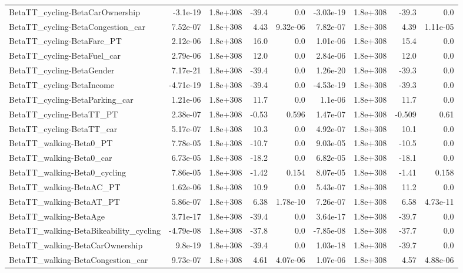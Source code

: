 \begin{tabular}{lrrrrrrrr}
BetaTT_cycling-BetaCarOwnership & -3.1e-19 & 1.8e+308 & -39.4 & 0.0 & -3.03e-19 & 1.8e+308 & -39.3 & 0.0 \\
BetaTT_cycling-BetaCongestion_car & 7.52e-07 & 1.8e+308 & 4.43 & 9.32e-06 & 7.82e-07 & 1.8e+308 & 4.39 & 1.11e-05 \\
BetaTT_cycling-BetaFare_PT & 2.12e-06 & 1.8e+308 & 16.0 & 0.0 & 1.01e-06 & 1.8e+308 & 15.4 & 0.0 \\
BetaTT_cycling-BetaFuel_car & 2.79e-06 & 1.8e+308 & 12.0 & 0.0 & 2.84e-06 & 1.8e+308 & 12.0 & 0.0 \\
BetaTT_cycling-BetaGender & 7.17e-21 & 1.8e+308 & -39.4 & 0.0 & 1.26e-20 & 1.8e+308 & -39.3 & 0.0 \\
BetaTT_cycling-BetaIncome & -4.71e-19 & 1.8e+308 & -39.4 & 0.0 & -4.53e-19 & 1.8e+308 & -39.3 & 0.0 \\
BetaTT_cycling-BetaParking_car & 1.21e-06 & 1.8e+308 & 11.7 & 0.0 & 1.1e-06 & 1.8e+308 & 11.7 & 0.0 \\
BetaTT_cycling-BetaTT_PT & 2.38e-07 & 1.8e+308 & -0.53 & 0.596 & 1.47e-07 & 1.8e+308 & -0.509 & 0.61 \\
BetaTT_cycling-BetaTT_car & 5.17e-07 & 1.8e+308 & 10.3 & 0.0 & 4.92e-07 & 1.8e+308 & 10.1 & 0.0 \\
BetaTT_walking-Beta0_PT & 7.78e-05 & 1.8e+308 & -10.7 & 0.0 & 9.03e-05 & 1.8e+308 & -10.5 & 0.0 \\
BetaTT_walking-Beta0_car & 6.73e-05 & 1.8e+308 & -18.2 & 0.0 & 6.82e-05 & 1.8e+308 & -18.1 & 0.0 \\
BetaTT_walking-Beta0_cycling & 7.86e-05 & 1.8e+308 & -1.42 & 0.154 & 8.07e-05 & 1.8e+308 & -1.41 & 0.158 \\
BetaTT_walking-BetaAC_PT & 1.62e-06 & 1.8e+308 & 10.9 & 0.0 & 5.43e-07 & 1.8e+308 & 11.2 & 0.0 \\
BetaTT_walking-BetaAT_PT & 5.86e-07 & 1.8e+308 & 6.38 & 1.78e-10 & 7.26e-07 & 1.8e+308 & 6.58 & 4.73e-11 \\
BetaTT_walking-BetaAge & 3.71e-17 & 1.8e+308 & -39.4 & 0.0 & 3.64e-17 & 1.8e+308 & -39.7 & 0.0 \\
BetaTT_walking-BetaBikeability_cycling & -4.79e-08 & 1.8e+308 & -37.8 & 0.0 & -7.85e-08 & 1.8e+308 & -37.7 & 0.0 \\
BetaTT_walking-BetaCarOwnership & 9.8e-19 & 1.8e+308 & -39.4 & 0.0 & 1.03e-18 & 1.8e+308 & -39.7 & 0.0 \\
BetaTT_walking-BetaCongestion_car & 9.73e-07 & 1.8e+308 & 4.61 & 4.07e-06 & 1.07e-06 & 1.8e+308 & 4.57 & 4.88e-06 \\

\end{tabular}
